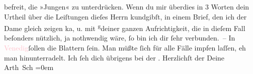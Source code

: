                befreit, {\pb}die »Jungen« zu unterdrücken.\pend
           \pstart
           Wenn du mir überdies in 3 Worten dein Urtheil über die Leiſtungen dieſes Herrn
               kundgibſt, in einem Brief, den ich der Dame gleich zeigen ka{\geminationn}, u. mit \substVorne{}\textsuperscript{g}\substDazwischen{}d\substHinten{}einer \introOben{}ganzen\introOben{} Aufrichtigkeit, die in dieſem Fall
               beſonders nützlich, ja nothwendig wäre, ſo bin ich dir ſehr verbunden. –\pend
           \pstart
           In \textcolor{pink}{Venedig}{}\ledrightnote{\textcolor{pink}{Venedig}}{ }ſollen die Blattern ſein. Man müßte ſich
               für alle Fälle impfen laſſen, eh man hinunter{\pb}radelt.\pend
           \pstart
           Ich ſeh dich übrigens bei der \label{K_L01212_2v}\label{K_L01212_2h}.\pend
           \pstart
           Herzlichſt der Deine{\\[\baselineskip]}\spacefill\mbox{Arth Sch}\pend
           \leftskip=0em{}\endnumbering{}  
      